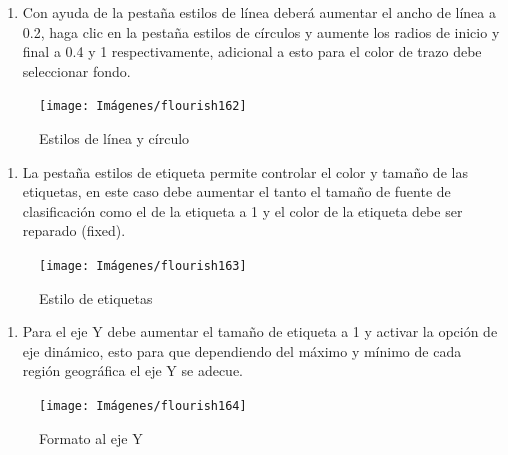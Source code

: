 \documentclass[
]{book}
\providecommand{\tightlist}{%
  \setlength{\itemsep}{0pt}\setlength{\parskip}{0pt}}
\begin{document}
\begin{enumerate}
\def\labelenumi{\arabic{enumi}.}
\setcounter{enumi}{5}
\tightlist
\item
  Con ayuda de la pestaña estilos de línea deberá aumentar el ancho de línea a 0.2, haga clic en la pestaña estilos de círculos y aumente los radios de inicio y final a 0.4 y 1 respectivamente, adicional a esto para el color de trazo debe seleccionar fondo.
\end{enumerate}

\begin{figure}

{\centering \texttt{[image: Imágenes/flourish162]} 

}

\caption{Estilos de línea y círculo}\label{fig:paso6carlineasflourish-fig}
\end{figure}

\begin{enumerate}
\def\labelenumi{\arabic{enumi}.}
\setcounter{enumi}{6}
\tightlist
\item
  La pestaña estilos de etiqueta permite controlar el color y tamaño de las etiquetas, en este caso debe aumentar el tanto el tamaño de fuente de clasificación como el de la etiqueta a 1 y el color de la etiqueta debe ser reparado (fixed).
\end{enumerate}

\begin{figure}

{\centering \texttt{[image: Imágenes/flourish163]} 

}

\caption{Estilo de etiquetas}\label{fig:paso7carlineasflourish-fig}
\end{figure}

\begin{enumerate}
\def\labelenumi{\arabic{enumi}.}
\setcounter{enumi}{7}
\tightlist
\item
  Para el eje Y debe aumentar el tamaño de etiqueta a 1 y activar la opción de eje dinámico, esto para que dependiendo del máximo y mínimo de cada región geográfica el eje Y se adecue.
\end{enumerate}

\begin{figure}

{\centering \texttt{[image: Imágenes/flourish164]} 

}

\caption{Formato al eje Y}\label{fig:paso8carlineasflourish-fig}
\end{figure}
\end{document}
